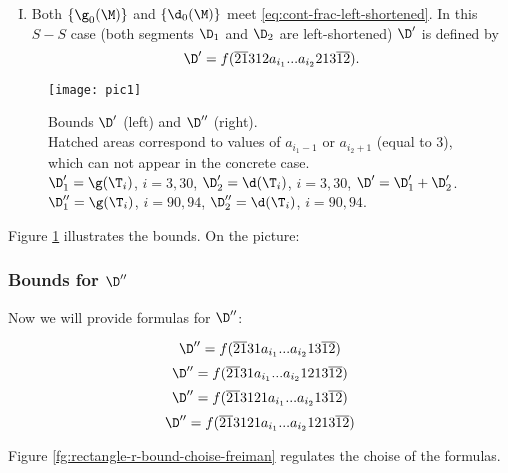 \begin{enumerate}[I.]
	\item Both $\{\g_0(\M)\}$ and $\{\d_0(\M)\}$
	meet \ref{eq:cont-frac-left-shortened}.
	In this $S-S$ case
	(both segments $\D_1$ and $\D_2$ are left-shortened)
	$\D'$ is defined by
	\begin{equation}
		\D' = f(\overline{21}312a_{i_1}... a_{i_2}213\overline{12}).
	\end{equation}
\end{enumerate}

\begin{figure}[p]
	\centering
	\texttt{[image: pic1]}
	\caption{
		Bounds $\D'$ (left) and $\D''$ (right).\\
		Hatched areas correspond to values of $a_{i_1 - 1}$ or $a_{i_2 + 1}$ (equal to 3),
		which can not appear in the concrete case. \\
		$\D_1' = \g(\T_i)$, $i=3,30$,
		$\D_2' = \d  (\T_i)$, $i=3,30$,
		$\D' = \D_1' + \D_2'$. \\
		$\D_1'' = \g(\T_i)$, $i = 90, 94$,
		$\D_2'' = \d  (\T_i)$, $i = 90, 94$.
	}
	\label{fg:rectangle-bounds-even}
\end{figure}

Figure \ref{fg:rectangle-bounds-even} illustrates the bounds. On the picture:

\subsubsection{Bounds for $\D''$}
Now we will provide formulas for $\D''$:

\begin{equation}\label{eq:bound-r-nnn}
	\D'' = f(\overline{21}31a_{i_1}... a_{i_2}13\overline{12})
\end{equation}
\begin{equation}\label{eq:bound-r-nns-ns}
	\D'' = f(\overline{21}31a_{i_1}... a_{i_2}1213\overline{12})
\end{equation}
\begin{equation}\label{eq:bound-r-ns}
	\D'' = f(\overline{21}3121a_{i_1}... a_{i_2}13\overline{12})
\end{equation}
\begin{equation}\label{eq:bound-r-sn}
	\D'' = f(\overline{21}3121a_{i_1}... a_{i_2}1213\overline{12})
\end{equation}

Figure \ref{fg:rectangle-r-bound-choise-freiman} regulates the choise of the formulas.

